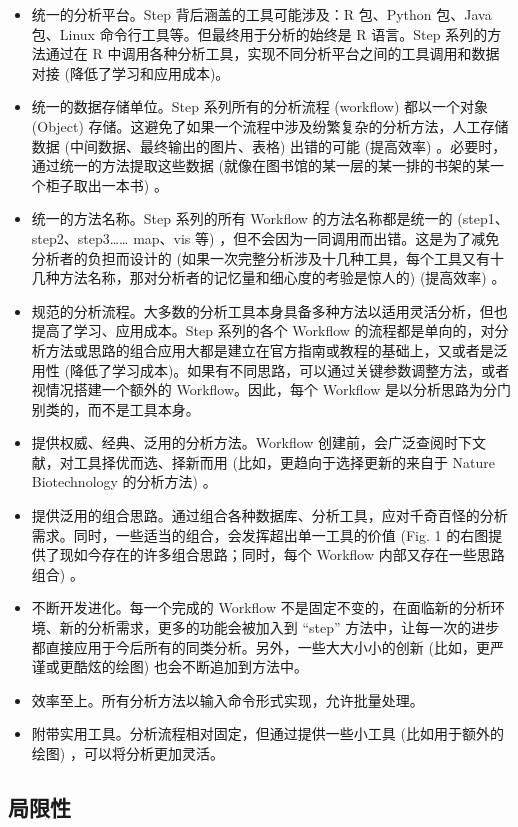\documentclass[
]{article}
\begin{document}
\begin{itemize}
\item
  统一的分析平台。Step 背后涵盖的工具可能涉及：R 包、Python 包、Java 包、Linux 命令行工具等。但最终用于分析的始终是 R 语言。Step 系列的方法通过在 R 中调用各种分析工具，实现不同分析平台之间的工具调用和数据对接 (降低了学习和应用成本)。
\item
  统一的数据存储单位。Step 系列所有的分析流程 (workflow) 都以一个对象 (Object) 存储。这避免了如果一个流程中涉及纷繁复杂的分析方法，人工存储数据 (中间数据、最终输出的图片、表格) 出错的可能 (提高效率) 。必要时，通过统一的方法提取这些数据 (就像在图书馆的某一层的某一排的书架的某一个柜子取出一本书) 。
\item
  统一的方法名称。Step 系列的所有 Workflow 的方法名称都是统一的 (step1、step2、step3\ldots\ldots{} map、vis 等) ，但不会因为一同调用而出错。这是为了减免分析者的负担而设计的 (如果一次完整分析涉及十几种工具，每个工具又有十几种方法名称，那对分析者的记忆量和细心度的考验是惊人的) (提高效率) 。
\item
  规范的分析流程。大多数的分析工具本身具备多种方法以适用灵活分析，但也提高了学习、应用成本。Step 系列的各个 Workflow 的流程都是单向的，对分析方法或思路的组合应用大都是建立在官方指南或教程的基础上，又或者是泛用性 (降低了学习成本)。如果有不同思路，可以通过关键参数调整方法，或者视情况搭建一个额外的 Workflow。因此，每个 Workflow 是以分析思路为分门别类的，而不是工具本身。
\item
  提供权威、经典、泛用的分析方法。Workflow 创建前，会广泛查阅时下文献，对工具择优而选、择新而用 (比如，更趋向于选择更新的来自于 Nature Biotechnology 的分析方法) 。
\item
  提供泛用的组合思路。通过组合各种数据库、分析工具，应对千奇百怪的分析需求。同时，一些适当的组合，会发挥超出单一工具的价值 (Fig. 1 的右图提供了现如今存在的许多组合思路；同时，每个 Workflow 内部又存在一些思路组合) 。
\item
  不断开发进化。每一个完成的 Workflow 不是固定不变的，在面临新的分析环境、新的分析需求，更多的功能会被加入到 ``step'' 方法中，让每一次的进步都直接应用于今后所有的同类分析。另外，一些大大小小的创新 (比如，更严谨或更酷炫的绘图) 也会不断追加到方法中。
\item
  效率至上。所有分析方法以输入命令形式实现，允许批量处理。
\item
  附带实用工具。分析流程相对固定，但通过提供一些小工具 (比如用于额外的绘图) ，可以将分析更加灵活。
\end{itemize}

\hypertarget{ux5c40ux9650ux6027}{%
\subsection{局限性}\label{ux5c40ux9650ux6027}}
\end{document}
